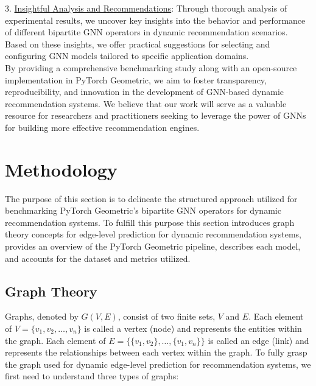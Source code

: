 \documentclass{scrartcl}
\begin{document}
3. \underline{Insightful Analysis and Recommendations}: Through thorough analysis of experimental results, we uncover key insights into the behavior and performance of different bipartite GNN operators in dynamic recommendation scenarios. Based on these insights, we offer practical suggestions for selecting and configuring GNN models tailored to specific application domains. \\ 

By providing a comprehensive benchmarking study along with an open-source implementation in PyTorch Geometric, we aim to foster transparency, reproducibility, and innovation in the development of GNN-based dynamic recommendation systems. We believe that our work will serve as a valuable resource for researchers and practitioners seeking to leverage the power of GNNs for building more effective recommendation engines.



\section{Methodology}

\quad The purpose of this section is to delineate the structured approach utilized for benchmarking PyTorch Geometric's bipartite GNN operators for dynamic recommendation systems. To fulfill this purpose this section introduces graph theory concepts for edge-level prediction for dynamic recommendation systems, provides an overview of the PyTorch Geometric pipeline, describes each model, and accounts for the dataset and metrics utilized.

\subsection{Graph Theory}

\quad Graphs, denoted by $G(V, E)$, consist of two finite sets, $V$ and $E$. Each element of $V = \{v_{1}, v_{2}, \ldots, v_{n}\}$ is called a vertex (node) and represents the entities within the graph. Each element of $E = \{ \{v_{1}, v_{2}\}, \ldots, \{v_{1}, v_{n}\}\}$ is called an edge (link) and represents the relationships between each vertex within the graph. To fully grasp the graph used for dynamic edge-level prediction for recommendation systems, we first need to understand three types of graphs: \\ 
\end{document}
